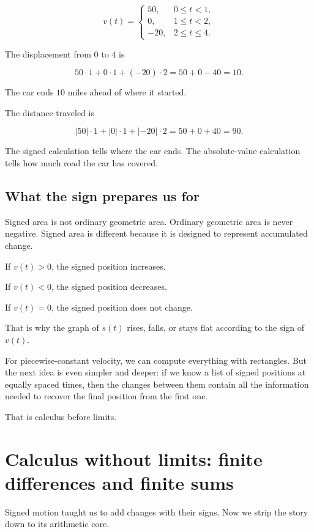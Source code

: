 \[
v(t)=
\begin{cases}
50, & 0\leq t<1,\\
0, & 1\leq t<2,\\
-20, & 2\leq t\leq 4.
\end{cases}
\]

The displacement from \(0\) to \(4\) is

\[
50\cdot 1+0\cdot 1+(-20)\cdot 2
=
50+0-40
=
10.
\]

The car ends \(10\) miles ahead of where it started.

The distance traveled is

\[
|50|\cdot 1+|0|\cdot 1+|-20|\cdot 2
=
50+0+40
=
90.
\]

The signed calculation tells where the car ends. The absolute-value calculation tells how much road the car has covered.

\subsection{What the sign prepares us for}

Signed area is not ordinary geometric area. Ordinary geometric area is never negative. Signed area is different because it is designed to represent accumulated change.

If \(v(t)>0\), the signed position increases.

If \(v(t)<0\), the signed position decreases.

If \(v(t)=0\), the signed position does not change.

That is why the graph of \(s(t)\) rises, falls, or stays flat according to the sign of \(v(t)\).

For piecewise-constant velocity, we can compute everything with rectangles. But the next idea is even simpler and deeper: if we know a list of signed positions at equally spaced times, then the changes between them contain all the information needed to recover the final position from the first one.

That is calculus before limits.

\section{Calculus without limits: finite differences and finite sums}
\label{sec:calculus-without-limits}

Signed motion taught us to add changes with their signs. Now we strip the story down to its arithmetic core.

